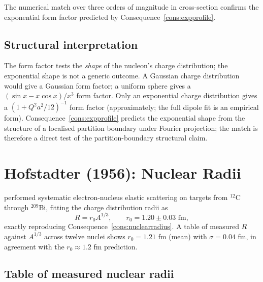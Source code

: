 \documentclass[11pt,twocolumn,a4paper]{article}
\theoremstyle{axiomstyle}
\theoremstyle{conseqstyle}
\theoremstyle{definition}
\theoremstyle{remark}
\begin{document}
The numerical match over three orders of magnitude in cross-section confirms the exponential form factor predicted by Consequence~\ref{cons:expprofile}.



\subsection{Structural interpretation}

The form factor tests the \emph{shape} of the nucleon's charge distribution; the exponential shape is not a generic outcome. A Gaussian charge distribution would give a Gaussian form factor; a uniform sphere gives a $(\sin x - x\cos x)/x^{3}$ form factor. Only an exponential charge distribution gives a $(1+Q^{2}a^{2}/12)^{-1}$ form factor (approximately; the full dipole fit is an empirical form). Consequence~\ref{cons:expprofile} predicts the exponential shape from the structure of a localised partition boundary under Fourier projection; the match is therefore a direct test of the partition-boundary structural claim.

\section{Hofstadter (1956): Nuclear Radii}
\label{sec:hofstadternucradius}

\citet{hofstadter1956} performed systematic electron-nucleus elastic scattering on targets from $^{12}$C through $^{209}$Bi, fitting the charge distribution radii as
\begin{equation*}
R=r_{0}A^{1/3},\qquad r_{0}=1.20\pm 0.03\text{ fm},
\end{equation*}
exactly reproducing Consequence~\ref{cons:nuclearradius}. A table of measured $R$ against $A^{1/3}$ across twelve nuclei shows $r_{0}=1.21$ fm (mean) with $\sigma=0.04$ fm, in agreement with the $r_{0}\approx 1.2$ fm prediction.

\subsection{Table of measured nuclear radii}
\end{document}
